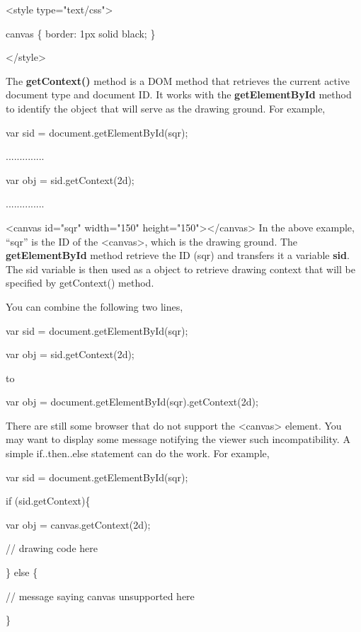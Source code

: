 \documentclass[
]{article}
\begin{document}
\textless style type="text/css"\textgreater{}

canvas \{ border: 1px solid black; \}

\textless/style\textgreater{}

The \textbf{getContext()} method is a DOM method that retrieves the
current active document type and document ID. It works with the
\textbf{getElementById} method to identify the object that will serve as
the drawing ground. For example,

var sid = document.getElementById(\textquotesingle sqr\textquotesingle);

..............

var obj = sid.getContext(\textquotesingle2d\textquotesingle);

..............

\textless canvas id="sqr" width="150"
height="150"\textgreater\textless/canvas\textgreater{} In the above
example, ``sqr'' is the ID of the \textless canvas\textgreater, which is
the drawing ground. The \textbf{getElementById} method retrieve the ID
(sqr) and transfers it a variable \textbf{sid}. The sid variable is then
used as a object to retrieve drawing context that will be specified by
getContext() method.

You can combine the following two lines,

var sid = document.getElementById(\textquotesingle sqr\textquotesingle);

var obj = sid.getContext(\textquotesingle2d\textquotesingle);

to

var obj =
document.getElementById(\textquotesingle sqr\textquotesingle).getContext(\textquotesingle2d\textquotesingle);

There are still some browser that do not support the
\textless canvas\textgreater{} element. You may want to display some
message notifying the viewer such incompatibility. A simple
if..then..else statement can do the work. For example,

var sid = document.getElementById(\textquotesingle sqr\textquotesingle);

if (sid.getContext)\{

var obj = canvas.getContext(\textquotesingle2d\textquotesingle);

// drawing code here

\} else \{

// message saying canvas unsupported here

\}
\end{document}
